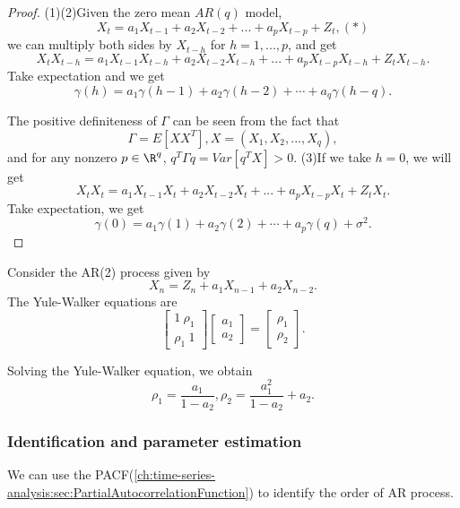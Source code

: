 \begin{proof}
(1)(2)Given the zero mean $AR(q)$ model,
$$X_t = a_1 X_{t-1} + a_2 X_{t-2} + ... + a_p X_{t-p} + Z_t,(*)$$	
we can multiply both sides by $X_{t-h}$ for $h=1,...,p$, and get
$$X_tX_{t-h} = a_1 X_{t-1}X_{t-h} + a_2 X_{t-2}X_{t-h} + ... + a_p X_{t-p}X_{t-h} + Z_tX_{t-h}.$$
Take expectation and we get
$$\gamma(h) = a_1\gamma(h-1) + a_2\gamma(h-2) + \cdots + a_q \gamma(h-q).$$

The positive definiteness of $\Gamma$ can be seen from the fact that $$\Gamma = E[XX^T],X = (X_1,X_2,...,X_q),$$
and for any nonzero $p\in \R^q$, $q^T\Gamma q = Var[q^TX] > 0. $
(3)If we take $h = 0$, we will get
$$X_tX_{t} = a_1 X_{t-1}X_{t} + a_2 X_{t-2}X_{t} + ... + a_p X_{t-p}X_{t} + Z_tX_{t}.$$
Take expectation, we get
$$\gamma(0) = a_1\gamma(1) + a_2\gamma(2) + \cdots + a_p\gamma(q) + \sigma^2.$$
\end{proof}

\begin{example}
Consider the AR(2) process given by
$$X_n = Z_n + a_1 X_{n-1} + a_2 X_{n-2}.$$
The Yule-Walker equations are 
$$\begin{bmatrix}
1 ~ \rho_1 \\
\rho_1 ~ 1
\end{bmatrix}\begin{bmatrix}
a_1 \\
a_2
\end{bmatrix} = \begin{bmatrix}
\rho_1 \\
\rho_2
\end{bmatrix}.$$

Solving the Yule-Walker equation, we obtain
$$\rho_1 = \frac{a_1}{1 - a_2}, \rho_2 = \frac{a_1^2}{1 - a_2} + a_2.$$	
\end{example}

\subsubsection{Identification and parameter estimation}

\begin{remark}
We can use the PACF(\autoref{ch:time-series-analysis:sec:PartialAutocorrelationFunction}) to identify the order of AR process.	
\end{remark}

